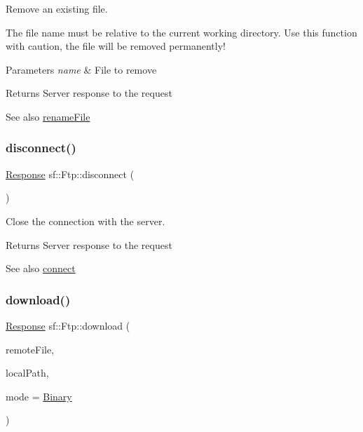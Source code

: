 Remove an existing file. 

The file name must be relative to the current working directory. Use this function with caution, the file will be removed permanently!


\begin{DoxyParams}{Parameters}
{\em name} & File to remove\\
\hline
\end{DoxyParams}
\begin{DoxyReturn}{Returns}
Server response to the request
\end{DoxyReturn}
\begin{DoxySeeAlso}{See also}
\hyperlink{classsf_1_1_ftp_a8f99251d7153e1dc26723e4006deb764}{rename\+File} 
\end{DoxySeeAlso}
\mbox{\label{classsf_1_1_ftp_acf7459926f3391cd06bf84337ed6a0f4}} 
\subsubsection{\texorpdfstring{disconnect()}{disconnect()}}
{\footnotesize\ttfamily \hyperlink{classsf_1_1_ftp_1_1_response}{Response} sf\+::\+Ftp\+::disconnect (\begin{DoxyParamCaption}{ }\end{DoxyParamCaption})}



Close the connection with the server. 

\begin{DoxyReturn}{Returns}
Server response to the request
\end{DoxyReturn}
\begin{DoxySeeAlso}{See also}
\hyperlink{classsf_1_1_ftp_af02fb3de3f450a50a27981961c69c860}{connect} 
\end{DoxySeeAlso}
\mbox{\label{classsf_1_1_ftp_a20c1600ec5fd6f5a2ad1429ab8aa5df4}} 
\subsubsection{\texorpdfstring{download()}{download()}}
{\footnotesize\ttfamily \hyperlink{classsf_1_1_ftp_1_1_response}{Response} sf\+::\+Ftp\+::download (\begin{DoxyParamCaption}\item[{const std\+::string \&}]{remote\+File,  }\item[{const std\+::string \&}]{local\+Path,  }\item[{\hyperlink{classsf_1_1_ftp_a1cd6b89ad23253f6d97e6d4ca4d558cb}{Transfer\+Mode}}]{mode = {\ttfamily \hyperlink{classsf_1_1_ftp_a1cd6b89ad23253f6d97e6d4ca4d558cba6f253b362639fb5e059dc292762a21ee}{Binary}} }\end{DoxyParamCaption})}



